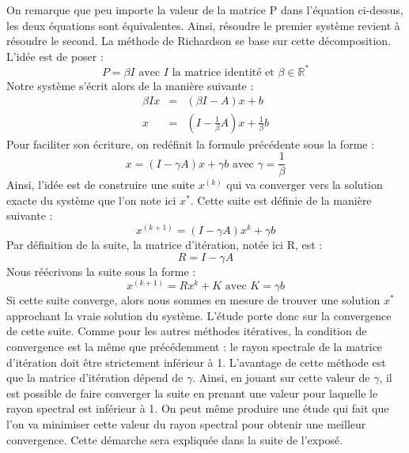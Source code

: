 On remarque que peu importe la valeur de la matrice P dans l'équation ci-dessus, les deux équations sont équivalentes. Ainsi, résoudre le premier système revient à résoudre le second. La méthode de Richardson se base sur cette décomposition. L'idée est de poser : 
\begin{equation}
	P = \beta I \text{ avec $I$ la matrice identité et $\beta \in \mathbb{R}^*$}
\end{equation}
Notre système s'écrit alors de la manière suivante : 
\begin{eqnarray}
\beta Ix &=& (\beta I - A)x + b\\
x &=& (I - \frac{1}{\beta} A)x + \frac{1}{\beta}b
\end{eqnarray}
Pour faciliter son écriture, on redéfinit la formule précédente sous la forme : 
\begin{equation}
x = (I - \gamma A)x + \gamma b \text{ avec $\gamma = \frac{1}{\beta}$}
\end{equation}
Ainsi, l'idée est de construire une suite $x^{(k)}$ qui va converger vers la solution exacte du système que l'on note ici $x^*$. Cette suite est définie de la manière suivante : 
\begin{equation}
x^{(k+1)} = (I - \gamma A)x^{k} + \gamma b
\end{equation}
Par définition de la suite, la matrice d'itération, notée ici R, est : 
\begin{equation}
R = I - \gamma A \label{R}
\end{equation}
Nous réécrivons la suite sous la forme : 
\begin{equation}
x^{(k+1)} = Rx^{k} + K \text{ avec $K = \gamma b$}
\end{equation}
Si cette suite converge, alors nous sommes en mesure de trouver une solution $x^*$ approchant la vraie solution du système. L'étude porte donc sur la convergence de cette suite. Comme pour les autres méthodes itératives, la condition de convergence est la même que précédemment : le rayon spectrale de la matrice d'itération doit être strictement inférieur à 1. L'avantage de cette méthode est que la matrice d'itération dépend de $\gamma$. Ainsi, en jouant sur cette valeur de $\gamma$, il est possible de faire converger la suite en prenant une valeur pour laquelle le rayon spectral est inférieur à 1. On peut même produire une étude qui fait que l'on va minimiser cette valeur du rayon spectral pour obtenir une meilleur convergence. Cette démarche sera expliquée dans la suite de l'exposé.
 
